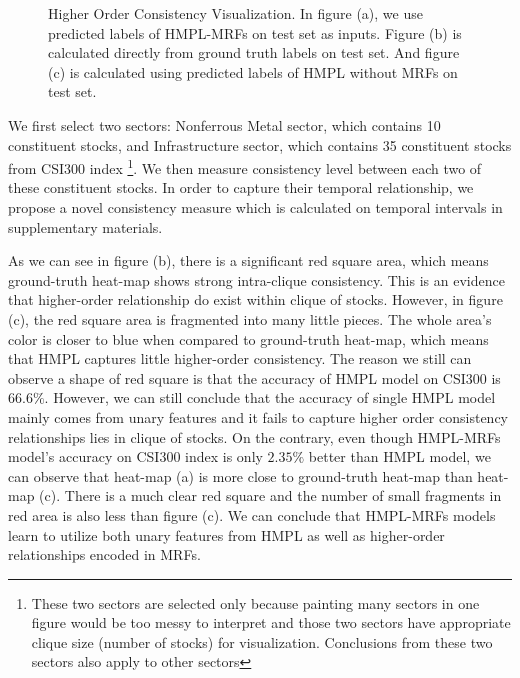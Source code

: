 \documentclass[sigconf,anonymous,review]{acmart}
\begin{document}
\begin{figure}[t]
\begin{tabular}{ccc}
  \end{tabular}
  \caption{\label{fig:consistency} Higher Order Consistency
    Visualization. In figure (a), we use predicted labels of
    HMPL-MRFs on test set as inputs. Figure (b) is calculated
    directly from ground truth labels on test set. And figure (c)
    is calculated using predicted labels of HMPL without MRFs on
    test set.}
\end{figure}

We first select two sectors: Nonferrous Metal sector, which
contains 10 constituent stocks, and Infrastructure sector, which
contains 35 constituent stocks from CSI300 index \footnote{These
  two sectors are selected only because painting many sectors in
  one figure would be too messy to interpret and those two
  sectors have appropriate clique size (number of stocks) for
  visualization. Conclusions from these two sectors also apply to
  other sectors}. We then measure consistency level between each
two of these constituent stocks. In order to capture their
temporal relationship, we propose a novel consistency measure
which is calculated on temporal intervals in supplementary 
materials.

As we can see in figure (b), there is a significant red square
area, which means ground-truth heat-map shows strong intra-clique
consistency. This is an evidence that higher-order relationship
do exist within clique of stocks. However, in figure (c), the red
square area is fragmented into many little pieces. The whole
area's color is closer to blue when compared to ground-truth
heat-map, which means that HMPL captures little higher-order consistency.
The reason we still can observe a shape of red square
is that the accuracy of HMPL model on CSI300 is $66.6\%$.
However, we can still conclude that the accuracy of single HMPL
model mainly comes from unary features and it fails to capture
higher order consistency relationships lies in clique of stocks.
On the contrary, even though HMPL-MRFs model's accuracy on CSI300
index is only $2.35\%$ better than HMPL model, we can observe
that heat-map (a) is more close to ground-truth heat-map than
heat-map (c). There is a much clear red square and the number of
small fragments in red area is also less than figure (c). We can
conclude that HMPL-MRFs models learn to utilize both unary
features from HMPL as well as higher-order relationships encoded
in MRFs.
\end{document}
